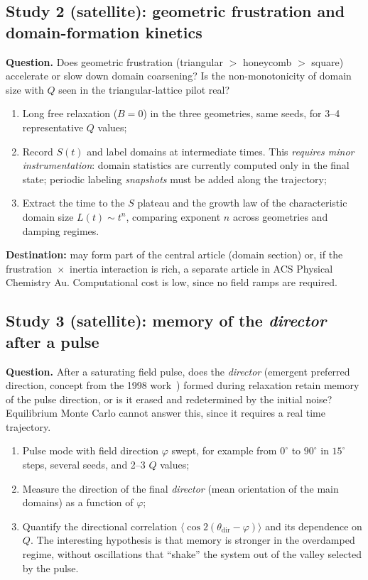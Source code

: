 \documentclass[11pt,a4paper]{article}
\begin{document}
\subsection{Study 2 (satellite): geometric frustration and domain-formation kinetics}

\textbf{Question.} Does geometric frustration (triangular $>$ honeycomb $>$ square) accelerate or slow down domain coarsening? Is the non-monotonicity of domain size with $Q$ seen in the triangular-lattice pilot real?

\begin{enumerate}
\item Long free relaxation ($B = 0$) in the three geometries, same seeds, for 3--4 representative $Q$ values;
\item Record $S(t)$ and label domains at intermediate times. This \emph{requires minor instrumentation}: domain statistics are currently computed only in the final state; periodic labeling \emph{snapshots} must be added along the trajectory;
\item Extract the time to the $S$ plateau and the growth law of the characteristic domain size $L(t) \sim t^{n}$, comparing exponent $n$ across geometries and damping regimes.
\end{enumerate}

\textbf{Destination:} may form part of the central article (domain section) or, if the frustration~$\times$~inertia interaction is rich, a separate article in ACS Physical Chemistry Au. Computational cost is low, since no field ramps are required.

\subsection{Study 3 (satellite): memory of the \emph{director} after a pulse}

\textbf{Question.} After a saturating field pulse, does the \emph{director} (emergent preferred direction, concept from the 1998 work~\cite{prb1998}) formed during relaxation retain memory of the pulse direction, or is it erased and redetermined by the initial noise? Equilibrium Monte Carlo cannot answer this, since it requires a real time trajectory.

\begin{enumerate}
\item Pulse mode with field direction $\varphi$ swept, for example from $0^\circ$ to $90^\circ$ in $15^\circ$ steps, several seeds, and 2--3 $Q$ values;
\item Measure the direction of the final \emph{director} (mean orientation of the main domains) as a function of $\varphi$;
\item Quantify the directional correlation $\langle \cos 2(\theta_{\mathrm{dir}} - \varphi) \rangle$ and its dependence on $Q$. The interesting hypothesis is that memory is stronger in the overdamped regime, without oscillations that ``shake'' the system out of the valley selected by the pulse.
\end{enumerate}
\end{document}
